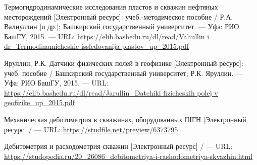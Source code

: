 \begingroup 
\renewcommand{\section}[2]{\anonsection{Библиографический список}}
\begin{thebibliography}{00}

    Термогидродинамические исследования пластов и скважин нефтяных месторождений
    [Электронный ресурс]: учеб.-методическое пособие /
    Р.А. Валиуллин [и др.];
    Башкирский государственный университет.
    --- Уфа: РИО БашГУ, 2015.
    --- URL: \url{https://elib.bashedu.ru/dl/read/Valiullin i dr_Termodinamicheskie issledovanija plastov_up_2015.pdf}

    Яруллин, Р.К. Датчики физических полей в геофизике
    [Электронный ресурс]: учеб. пособие /
    Башкирский государственный университет; Р.К. Яруллин.
    --- Уфа: РИО БашГУ, 2015.
    --- URL: \url{https://elib.bashedu.ru/dl/read/Jarullin_Datchiki fizicheskih polej v geofizike_up_2015.pdf}

    Механическая дебитометрия в скважинах, оборудованных ШГН
    [Электронный ресурс] /
    --- URL: \url{https://studfile.net/preview/6373795}

    Дебитометрия и расходометрия скважин
    [Электронный ресурс] /
    --- URL: \url{https://studopedia.ru/20\_26086\_debitometriya-i-rashodometriya-skvazhin.html}

\end{thebibliography}
\endgroup

\clearpage
